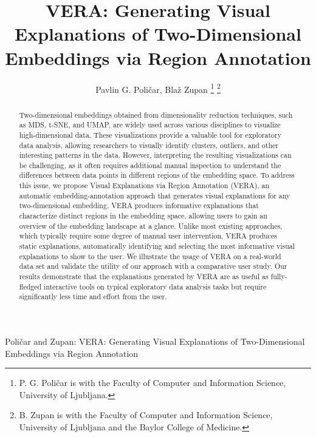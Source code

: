 \documentclass[lettersize,journal]{IEEEtran}
\begin{document}
\title{VERA: Generating Visual Explanations of Two-Dimensional Embeddings via Region Annotation}

\newcommand{\etal}{\textit{et al.}}

\author{Pavlin G. Poli\v{c}ar, Bla\v{z} Zupan
\thanks{P. G. Poli\v{c}ar is with the Faculty of Computer and Information Science, University of Ljubljana.}%
\thanks{B. Zupan is with the Faculty of Computer and Information Science, University of Ljubljana and the Baylor College of Medicine.}}

\markboth{}%
{Poli\v{c}ar and Zupan: VERA: Generating Visual Explanations of Two-Dimensional Embeddings via Region Annotation}

\IEEEpubid{}

\maketitle

\begin{abstract}
Two-dimensional embeddings obtained from dimensionality reduction techniques, such as MDS, t-SNE, and UMAP, are widely used across various disciplines to visualize high-dimensional data. These visualizations provide a valuable tool for exploratory data analysis, allowing researchers to visually identify clusters, outliers, and other interesting patterns in the data. However, interpreting the resulting visualizations can be challenging, as it often requires additional manual inspection to understand the differences between data points in different regions of the embedding space. To address this issue, we propose Visual Explanations via Region Annotation (VERA), an automatic embedding-annotation approach that generates visual explanations for any two-dimensional embedding. VERA produces informative explanations that characterize distinct regions in the embedding space, allowing users to gain an overview of the embedding landscape at a glance. Unlike most existing approaches, which typically require some degree of manual user intervention, VERA produces static explanations, automatically identifying and selecting the most informative visual explanations to show to the user. We illustrate the usage of VERA on a real-world data set and validate the utility of our approach with a comparative user study. Our results demonstrate that the explanations generated by VERA are as useful as fully-fledged interactive tools on typical exploratory data analysis tasks but require significantly less time and effort from the user.
\end{abstract}
\end{document}
